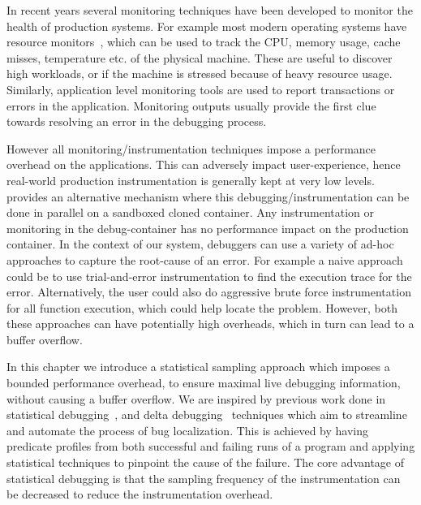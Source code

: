 \iffalse
In recent years several monitoring techniques have been developed to monitor the health of production systems.
For example most modern operating systems have resource monitors~\cite{linuxHealth, windowsHealth, macHealth}, which can be used to track the CPU, memory usage, cache misses, temperature etc. of the physical machine.
These are useful to discover high workloads, or if the machine is stressed because of heavy resource usage.
Similarly, application level monitoring tools are used to report transactions or errors in the application.
Monitoring outputs usually provide the first clue towards resolving an error in the debugging process.

However all monitoring/instrumentation techniques impose a performance overhead on the applications.
This can adversely impact user-experience, hence real-world production instrumentation is generally kept at very low levels.
\parikshan provides an alternative mechanism where this debugging/instrumentation can be done in parallel on a sandboxed cloned container.
Any instrumentation or monitoring in the debug-container has no performance impact on the production container.
In the context of our system, debuggers can use a variety of ad-hoc approaches to capture the root-cause of an error.
For example a naive approach could be to use trial-and-error instrumentation to find the execution trace for the error.
Alternatively, the user could also do aggressive brute force instrumentation for all function execution, which could help locate the problem.
However, both these approaches can have potentially high overheads, which in turn can lead to a buffer overflow.

In this chapter we introduce a statistical sampling approach which imposes a bounded performance overhead, to ensure maximal live debugging information, without causing a buffer overflow.
We are inspired by previous work done in statistical debugging~\cite{cbi}, and delta debugging~\cite{delta} techniques which aim to streamline and automate the process of bug localization.
This is achieved by having predicate profiles from both successful and failing runs of a program and applying statistical techniques to pinpoint the cause of the failure.
The core advantage of statistical debugging is that the sampling frequency of the instrumentation can be decreased to reduce the instrumentation overhead.

